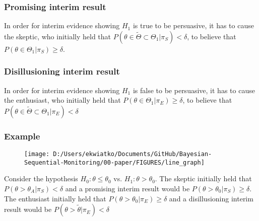 \documentclass[12pt]{article}
\begin{document}
\subsubsection*{Promising interim result}
In order for interim evidence showing $H_1$ is true to be persuasive, it has to cause the skeptic, who initially held that $P(\theta\in\tilde{\Theta}\subset\Theta_1| \pi_{S})<\delta$, to believe that $P(\theta\in\Theta_1| \pi_{S})\geq\delta$.
\subsubsection*{Disillusioning interim result}
In order for interim evidence showing $H_1$ is false to be persuasive, it has to cause the enthusiast, who initially held that $P(\theta\in\Theta_1| \pi_{E})\geq\delta$, to believe that $P(\theta\in\tilde{\Theta}\subset\Theta_1| \pi_{E})<\delta$

\subsubsection*{Example}
\begin{figure}
\texttt{[image: D:/Users/ekwiatko/Documents/GitHub/Bayesian-Sequential-Monitoring/00-paper/FIGURES/line\_graph]}
\caption{}
\end{figure}

Consider the hypothesis $H_0:\theta\leq\theta_0$ vs. $H_1:\theta>\theta_0$. The skeptic initially held that $P(\theta>\theta_A| \pi_{S})<\delta$ and a promising interim result would be $P(\theta>\theta_0| \pi_{S})\geq\delta$. The enthusiast initially held that $P(\theta>\theta_0| \pi_{E})\geq\delta$ and a disillusioning interim result would be $P(\theta>\tilde{\theta}| \pi_{E})<\delta$
\end{document}
